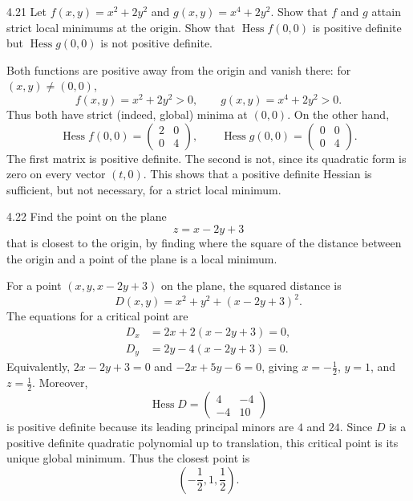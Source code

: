 \documentclass[11pt,oneside]{article}
\begin{document}
\begin{problem}{4.21}
Let $f(x,y)=x^2+2y^2$ and $g(x,y)=x^4+2y^2$.
Show that $f$ and $g$ attain strict local minimums at the origin.
Show that $\operatorname{Hess}f(0,0)$ is positive definite but
$\operatorname{Hess}g(0,0)$ is not positive definite.
\end{problem}
\begin{solution}
Both functions are positive away from the origin and vanish there:
for $(x,y)\ne(0,0)$,
\[
 f(x,y)=x^2+2y^2>0,
 \qquad g(x,y)=x^4+2y^2>0.
\]
Thus both have strict (indeed, global) minima at $(0,0)$.
On the other hand,
\[
 \operatorname{Hess}f(0,0)=\begin{pmatrix}2&0\\0&4\end{pmatrix},
 \qquad
 \operatorname{Hess}g(0,0)=\begin{pmatrix}0&0\\0&4\end{pmatrix}.
\]
The first matrix is positive definite. The second is not,
since its quadratic form is zero on every vector $(t,0)$.
This shows that a positive definite Hessian is sufficient,
but not necessary, for a strict local minimum.
\end{solution}

\begin{problem}{4.22}
Find the point on the plane
\[
 z=x-2y+3
\]
that is closest to the origin, by finding where the square of the
distance between the origin and a point of the plane is a local minimum.
\end{problem}
\begin{solution}
For a point $(x,y,x-2y+3)$ on the plane, the squared distance is
\[
 D(x,y)=x^2+y^2+(x-2y+3)^2.
\]
The equations for a critical point are
\[
 \begin{aligned}
 D_x&=2x+2(x-2y+3)=0,\\
 D_y&=2y-4(x-2y+3)=0.
 \end{aligned}
\]
Equivalently,
$2x-2y+3=0$ and $-2x+5y-6=0$, giving
$x=-\frac12$, $y=1$, and $z=\frac12$.
Moreover,
\[
 \operatorname{Hess}D=\begin{pmatrix}4&-4\\-4&10\end{pmatrix}
\]
is positive definite because its leading principal minors are
$4$ and $24$. Since $D$ is a positive definite quadratic polynomial
up to translation, this critical point is its unique global minimum.
Thus the closest point is
\[
 \boxed{\left(-\frac12,1,\frac12\right)}.
\]
\end{solution}
\end{document}
